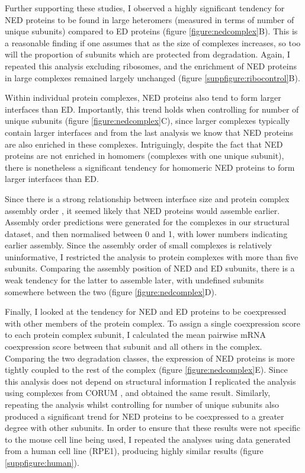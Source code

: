 \documentclass[a4paper,11pt,twoside,openright]{scrbook}
\begin{document}
Further supporting these studies, I observed a highly significant tendency for NED proteins to be found in large heteromers (measured in terms of number of unique subunits) compared to ED proteins (figure \ref{figure:nedcomplex}B). This is a reasonable finding if one assumes that as the size of complexes increases, so too will the proportion of subunits which are protected from degradation. Again, I repeated this analysis excluding ribosomes, and the enrichment of NED proteins in large complexes remained largely unchanged (figure \ref{suppfigure:ribocontrol}B).

Within individual protein complexes, NED proteins also tend to form larger interfaces than ED. Importantly, this trend holds when controlling for number of unique subunits (figure \ref{figure:nedcomplex}C), since larger complexes typically contain larger interfaces and from the last analysis we know that NED proteins are also enriched in these complexes. Intriguingly, despite the fact that NED proteins are not enriched in homomers (complexes with one unique subunit), there is nonetheless a significant tendency for homomeric NED proteins to form larger interfaces than ED.

Since there is a strong relationship between interface size and protein complex assembly order \cite{Marsh2013}, it seemed likely that NED proteins would assemble earlier. Assembly order predictions were generated for the complexes in our structural dataset, and then normalised between 0 and 1, with lower numbers indicating earlier assembly. Since the assembly order of small complexes is relatively uninformative, I restricted the analysis to protein complexes with more than five subunits. Comparing the assembly position of NED and ED subunits, there is a weak tendency for the latter to assemble later, with undefined subunits somewhere between the two (figure \ref{figure:nedcomplex}D).

Finally, I looked at the tendency for NED and ED proteins to be coexpressed with other members of the protein complex. To assign a single coexpression score to each protein complex subunit, I calculated the mean pairwise mRNA coexpression score between that subunit and all others in the complex. Comparing the two degradation classes, the expression of NED proteins is more tightly coupled to the rest of the complex (figure \ref{figure:nedcomplex}E). Since this analysis does not depend on structural information I replicated the analysis using complexes from CORUM \cite{Ruepp2009}, and obtained the same result. Similarly, repeating the analysis whilst controlling for number of unique subunits also produced a significant trend for NED proteins to be coexpressed to a greater degree with other subunits. In order to ensure that these results were not specific to the mouse cell line being used, I repeated the analyses using data generated from a human cell line (RPE1), producing highly similar results (figure \ref{suppfigure:human}).
\end{document}
